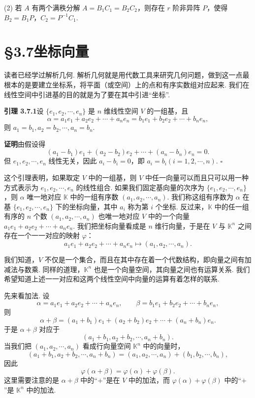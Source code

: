 \documentclass[UTF8, 12pt, fontset=fandol, oneside]{ctexart}
\begin{document}
(2) 若 $A$ 有两个满秩分解 $A=B_1C_1=B_2C_2$，则存在 $r$ 阶非异阵 $P$，使得 $B_2=B_1P$，$C_2=P^{-1}C_1$.

\section*{§3.7\quad 坐标向量}

读者已经学过解析几何. 解析几何就是用代数工具来研究几何问题，做到这一点最根本的是要建立坐标系，将平面（或空间）上的点和有序实数组对应起来. 我们在线性空间中引进基的目的就是为了要在其中引进“坐标”.

\noindent\textbf{引理 3.7.1}\quad 设 $\{e_1,e_2,\cdots,e_n\}$ 是 $n$ 维线性空间 $V$ 的一组基，且
\[
\alpha=a_1e_1+a_2e_2+\cdots+a_ne_n=b_1e_1+b_2e_2+\cdots+b_ne_n,
\]
则 $a_1=b_1,a_2=b_2,\cdots,a_n=b_n$.

\noindent\textbf{证明}\quad 由假设得
\[
(a_1-b_1)e_1+(a_2-b_2)e_2+\cdots+(a_n-b_n)e_n=0.
\]
但 $e_1,e_2,\cdots,e_n$ 线性无关，因此 $a_i-b_i=0$，即 $a_i=b_i(i=1,2,\cdots,n)$. $\square$

这个引理表明，如果取定 $V$ 中的一组基，则 $V$ 中任一向量可以而且只可以用一种方式表示为 $e_1,e_2,\cdots,e_n$ 的线性组合. 如果我们固定基向量的次序为 $\{e_1,e_2,\cdots,e_n\}$，则 $\alpha$ 唯一地对应 $\mathbb{K}$ 中的一组有序数 $(a_1,a_2,\cdots,a_n)$. 我们称这组有序数为 $\alpha$ 在基 $\{e_1,e_2,\cdots,e_n\}$ 下的坐标向量，其中 $a_i$ 称为第 $i$ 个坐标. 反过来，$\mathbb{K}$ 中的任一组有序的 $n$ 个数 $(a_1,a_2,\cdots,a_n)$ 也唯一地对应 $V$ 中的一个向量 $a_1e_1+a_2e_2+\cdots+a_ne_n$. 我们把坐标向量看成是 $n$ 维行向量，于是在 $V$ 与 $\mathbb{K}^n$ 之间存在一个一一对应的映射 $\varphi$：
\[
a_1e_1+a_2e_2+\cdots+a_ne_n\mapsto (a_1,a_2,\cdots,a_n).
\]

我们知道，$V$ 不仅是一个集合，而且在其中存在着一个代数结构，即向量之间有加减法与数乘. 同样的道理，$\mathbb{K}^n$ 也是一个向量空间，其向量之间也有运算关系. 我们希望知道上述一一对应和这两个线性空间中向量的运算有着怎样的联系.

先来看加法. 设
\[
\alpha=a_1e_1+a_2e_2+\cdots+a_ne_n,\qquad
\beta=b_1e_1+b_2e_2+\cdots+b_ne_n,
\]
则
\[
\alpha+\beta=(a_1+b_1)e_1+(a_2+b_2)e_2+\cdots+(a_n+b_n)e_n.
\]
于是 $\alpha+\beta$ 对应于
\[
(a_1+b_1,a_2+b_2,\cdots,a_n+b_n).
\]
当我们把 $(a_1,a_2,\cdots,a_n)$ 看成行向量空间 $\mathbb{K}^n$ 中的向量时，
\[
(a_1+b_1,a_2+b_2,\cdots,a_n+b_n)=(a_1,a_2,\cdots,a_n)+(b_1,b_2,\cdots,b_n),
\]
因此
\[
\varphi(\alpha+\beta)=\varphi(\alpha)+\varphi(\beta).
\]
这里需要注意的是 $\alpha+\beta$ 中的“$+$”是在 $V$ 中的加法，而 $\varphi(\alpha)+\varphi(\beta)$ 中的“$+$”是 $\mathbb{K}^n$ 中的加法.
\end{document}
